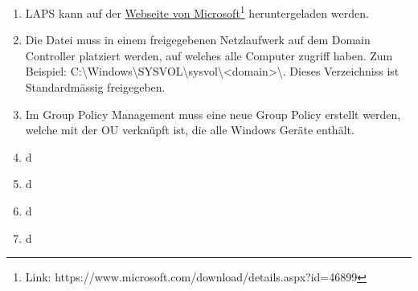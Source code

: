 \begin{enumerate}
    \item LAPS kann auf der \href{https://www.microsoft.com/download/details.aspx?id=46899}{Webseite von Microsoft}\footnote{Link: https://www.microsoft.com/download/details.aspx?id=46899} heruntergeladen werden.
    \item Die Datei muss in einem freigegebenen Netzlaufwerk auf dem Domain Controller platziert werden, auf welches alle Computer zugriff haben.
          Zum Beispiel: C:\textbackslash Windows\textbackslash SYSVOL\textbackslash sysvol\textbackslash <domain>\textbackslash.
          Dieses Verzeichniss ist Standardmässig freigegeben.
    \item Im Group Policy Management muss eine neue Group Policy erstellt werden, welche mit der OU verknüpft ist, die alle Windows Geräte enthält.

    \item d
    \item d
    \item d
    \item d
\end{enumerate}
%
%
%
%
%
%
%
%
%
